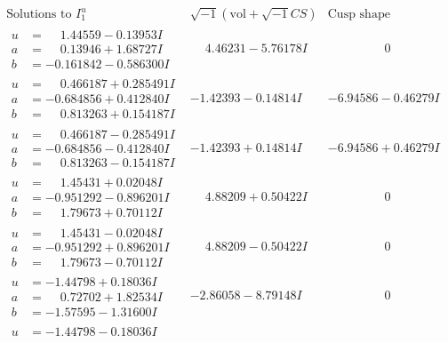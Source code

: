 \documentclass[1p]{elsarticle_modified}
\theoremstyle{definition}
\newcommand{\I}{\sqrt{-1}}
\begin{document}
$$\begin{array}{c|c|c}
\text{Solutions to }I^u_{1}& \I (\text{vol} + \sqrt{-1}CS) & \text{Cusp shape}\\
 \hline 
\begin{aligned}
u &= \phantom{-}1.44559 - 0.13953 I \\
a &= \phantom{-}0.13946 + 1.68727 I \\
b &= -0.161842 - 0.586300 I\end{aligned}
 & \phantom{-}4.46231 - 5.76178 I & \phantom{-0.000000 } 0 \\ \hline\begin{aligned}
u &= \phantom{-}0.466187 + 0.285491 I \\
a &= -0.684856 + 0.412840 I \\
b &= \phantom{-}0.813263 + 0.154187 I\end{aligned}
 & -1.42393 - 0.14814 I & -6.94586 - 0.46279 I \\ \hline\begin{aligned}
u &= \phantom{-}0.466187 - 0.285491 I \\
a &= -0.684856 - 0.412840 I \\
b &= \phantom{-}0.813263 - 0.154187 I\end{aligned}
 & -1.42393 + 0.14814 I & -6.94586 + 0.46279 I \\ \hline\begin{aligned}
u &= \phantom{-}1.45431 + 0.02048 I \\
a &= -0.951292 - 0.896201 I \\
b &= \phantom{-}1.79673 + 0.70112 I\end{aligned}
 & \phantom{-}4.88209 + 0.50422 I & \phantom{-0.000000 } 0 \\ \hline\begin{aligned}
u &= \phantom{-}1.45431 - 0.02048 I \\
a &= -0.951292 + 0.896201 I \\
b &= \phantom{-}1.79673 - 0.70112 I\end{aligned}
 & \phantom{-}4.88209 - 0.50422 I & \phantom{-0.000000 } 0 \\ \hline\begin{aligned}
u &= -1.44798 + 0.18036 I \\
a &= \phantom{-}0.72702 + 1.82534 I \\
b &= -1.57595 - 1.31600 I\end{aligned}
 & -2.86058 - 8.79148 I & \phantom{-0.000000 } 0 \\ \hline\begin{aligned}
u &= -1.44798 - 0.18036 I \\

\end{aligned}
\end{array}$$
\end{document}
